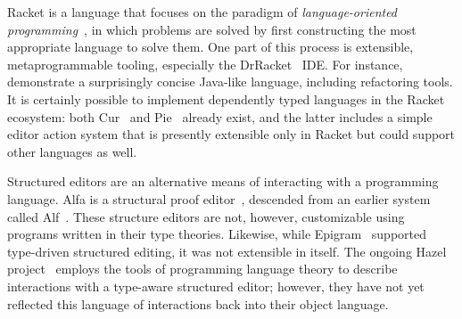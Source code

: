Racket is a language that focuses on the paradigm of
\emph{language-oriented programming}~\citep{racketManifesto}, in which
problems are solved by first constructing the most appropriate
language to solve them. One part of this process is extensible,
metaprogrammable tooling, especially the DrRacket~\cite{revenge}
IDE. For instance, \citet{feltey2016languages} demonstrate a
surprisingly concise Java-like language, including refactoring tools.
It is certainly possible to implement dependently typed languages in
the Racket ecosystem: both Cur~\cite{cur} and
Pie~\cite{theLittleTyper} already exist, and the latter includes a
simple editor action system that is presently extensible only in
Racket but could support other languages as well.

Structured editors are an alternative means of interacting with a
programming language.  Alfa is a structural proof editor~\cite{alfa},
descended from an earlier system called Alf~\citep{ALF, ALFthesis}.
These structure editors are not, however, customizable using programs
written in their type theories. Likewise, while
Epigram~\citep{epigram} supported type-driven structured editing, it
was not extensible in itself. The ongoing Hazel
project~\cite{hazelnut,hazelEditor} employs the tools of programming
language theory to describe interactions with a type-aware structured
editor; however, they have not yet reflected this language of
interactions back into their object language.




